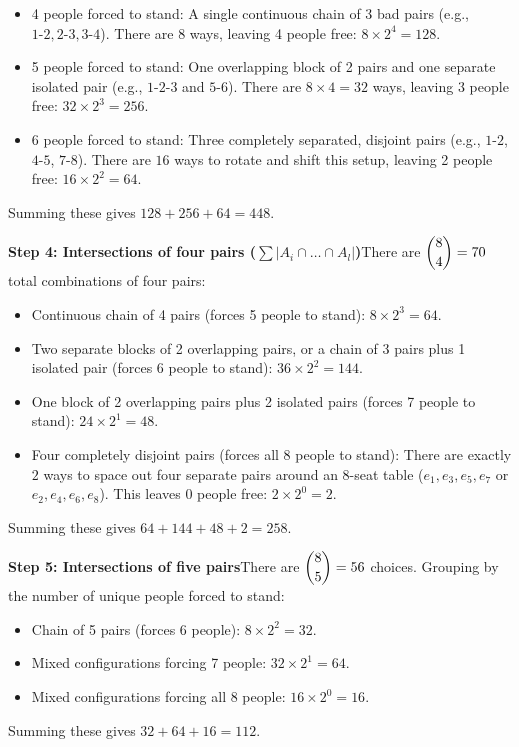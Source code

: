 \begin{enumerate}
 
            \begin{itemize}
        \item 4 people forced to stand: A single continuous chain of 3 bad pairs (e.g., $1\text{-}2, 2\text{-}3, 3\text{-}4$). There are $8$ ways, leaving 4 people free: $8 \times 2^4 = 128$.
        \item 5 people forced to stand: One overlapping block of 2 pairs and one separate isolated pair (e.g., $1\text{-}2\text{-}3$ and $5\text{-}6$). There are $8 \times 4 = 32$ ways, leaving 3 people free: $32 \times 2^3 = 256$.
        \item 6 people forced to stand: Three completely separated, disjoint pairs (e.g., $1\text{-}2$, $4\text{-}5$, $7\text{-}8$). There are $16$ ways to rotate and shift this setup, leaving 2 people free: $16 \times 2^2 = 64$.
            \end{itemize}
            Summing these gives $128 + 256 + 64 = 448$.

 \textbf{Step 4: Intersections of four pairs ($\sum |A_i \cap \dots \cap A_l|$)}There are $\dbinom{8}{4} = 70$ total combinations of four pairs:

 
            \begin{itemize}
        \item Continuous chain of 4 pairs (forces 5 people to stand): $8 \times 2^3 = 64$.
        \item Two separate blocks of 2 overlapping pairs, or a chain of 3 pairs plus 1 isolated pair (forces 6 people to stand): $36 \times 2^2 = 144$.
        \item One block of 2 overlapping pairs plus 2 isolated pairs (forces 7 people to stand): $24 \times 2^1 = 48$.
        \item Four completely disjoint pairs (forces all 8 people to stand): There are exactly $2$ ways to space out four separate pairs around an 8-seat table ($e_1, e_3, e_5, e_7$ or $e_2, e_4, e_6, e_8$). This leaves 0 people free: $2 \times 2^0 = 2$.
            \end{itemize}
            Summing these gives $64 + 144 + 48 + 2 = 258$.

 \textbf{Step 5: Intersections of five pairs}There are $\dbinom{8}{5} = 56$ choices. Grouping by the number of unique people forced to stand:

 
            \begin{itemize}
        \item Chain of 5 pairs (forces 6 people): $8 \times 2^2 = 32$.
        \item Mixed configurations forcing 7 people: $32 \times 2^1 = 64$.
        \item Mixed configurations forcing all 8 people: $16 \times 2^0 = 16$.
            \end{itemize}
            Summing these gives $32 + 64 + 16 = 112$.


\end{enumerate}
